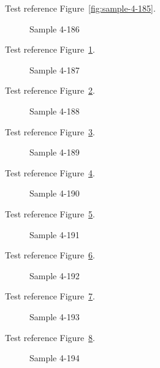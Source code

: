 Test reference Figure~\ref{fig:sample-4-185}.

\begin{figure}[tbhp]
\caption{Sample 4-186}
\label{fig:sample-4-186}
\end{figure}

Test reference Figure~\ref{fig:sample-4-186}.

\begin{figure}[tbhp]
\caption{Sample 4-187}
\label{fig:sample-4-187}
\end{figure}

Test reference Figure~\ref{fig:sample-4-187}.

\begin{figure}[tbhp]
\caption{Sample 4-188}
\label{fig:sample-4-188}
\end{figure}

Test reference Figure~\ref{fig:sample-4-188}.

\begin{figure}[tbhp]
\caption{Sample 4-189}
\label{fig:sample-4-189}
\end{figure}

Test reference Figure~\ref{fig:sample-4-189}.

\begin{figure}[tbhp]
\caption{Sample 4-190}
\label{fig:sample-4-190}
\end{figure}

Test reference Figure~\ref{fig:sample-4-190}.

\begin{figure}[tbhp]
\caption{Sample 4-191}
\label{fig:sample-4-191}
\end{figure}

Test reference Figure~\ref{fig:sample-4-191}.

\begin{figure}[tbhp]
\caption{Sample 4-192}
\label{fig:sample-4-192}
\end{figure}

Test reference Figure~\ref{fig:sample-4-192}.

\begin{figure}[tbhp]
\caption{Sample 4-193}
\label{fig:sample-4-193}
\end{figure}

Test reference Figure~\ref{fig:sample-4-193}.

\begin{figure}[tbhp]
\caption{Sample 4-194}
\label{fig:sample-4-194}
\end{figure}

